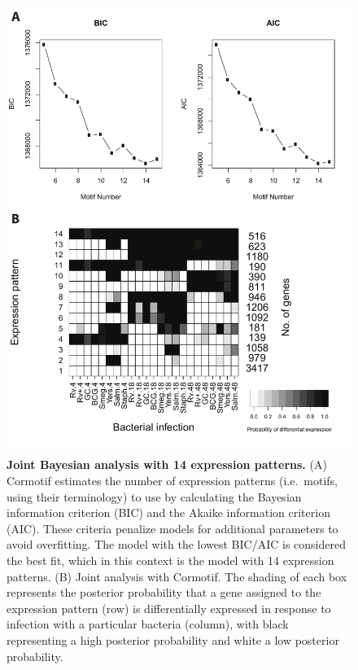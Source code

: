 \begin{figure}[!htb]
\centering
\includegraphics[width=5in]{img/ch02/fig-S03-joint-all-k14.pdf}
\caption[Joint Bayesian analysis with 14 expression
  patterns.]{\textbf{Joint Bayesian analysis with 14 expression
    patterns.} (A) Cormotif \citep{Wei2015} estimates the number of
  expression patterns (i.e.~motifs, using their terminology) to use by
  calculating the Bayesian information criterion (BIC) and the Akaike
  information criterion (AIC). These criteria penalize models for
  additional parameters to avoid overfitting. The model with the
  lowest BIC/AIC is considered the best fit, which in this context is
  the model with 14 expression patterns. (B) Joint analysis with
  Cormotif. The shading of each box represents the posterior
  probability that a gene assigned to the expression pattern (row) is
  differentially expressed in response to infection with a particular
  bacteria (column), with black representing a high posterior
  probability and white a low posterior probability.}
\label{fig:joint-all-k14}
\end{figure}

